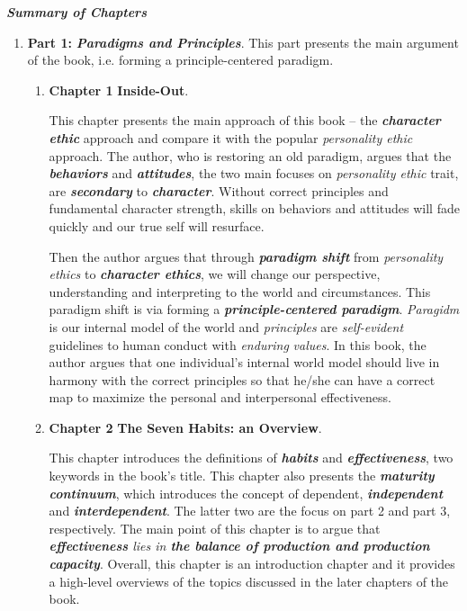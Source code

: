\documentclass[11pt]{article}
\begin{document}
\emph{\textbf{Summary of Chapters}}
\begin{enumerate}
\item  \textbf{Part 1: } \emph{\textbf{Paradigms and Principles}}. This part presents the main argument of the book, i.e. forming a principle-centered paradigm. 
\begin{enumerate}
\item \textbf{Chapter 1} \textbf{Inside-Out}. 

This chapter presents the main approach of this book -- the \emph{\textbf{character ethic}} approach and compare it with the popular \emph{personality ethic} approach. The author, who is restoring an old paradigm, argues that the \emph{\textbf{behaviors}} and \emph{\textbf{attitudes}}, the two main focuses on \emph{personality ethic} trait, are \emph{\textbf{secondary}} to \emph{\textbf{character}}. Without correct principles and fundamental character strength, skills on behaviors and attitudes will fade quickly and our true self will resurface. 

Then the author argues that through \emph{\textbf{paradigm shift}} from \emph{personality ethics} to \emph{\textbf{character ethics}}, we will change our perspective, understanding and interpreting to the world and circumstances. This paradigm shift is via forming a \emph{\textbf{principle-centered paradigm}}. \emph{Paragidm} is our internal model of the world and \emph{principles} are \emph{self-evident} guidelines to human conduct with \emph{enduring} \emph{values}. In this book, the author argues that one individual's internal world model should live in harmony with the correct principles so that he/she can have a correct map to maximize the personal and interpersonal effectiveness.

\item \textbf{Chapter 2} \textbf{The Seven Habits: an Overview}.

This chapter introduces the definitions of \emph{\textbf{habits}} and \emph{\textbf{effectiveness}}, two keywords in the book's title. This chapter also presents the \emph{\textbf{maturity continuum}}, which introduces the concept of dependent, \emph{\textbf{independent}} and \emph{\textbf{interdependent}}. The latter two are the focus on part 2 and part 3, respectively.  The main point of this chapter is to argue that \emph{\textbf{effectiveness} lies in \textbf{the balance of production and production capacity}}. Overall, this chapter is an introduction chapter  and it provides a high-level overviews of the topics discussed in the later chapters of the book.
\end{enumerate}



\end{enumerate}
\end{document}
